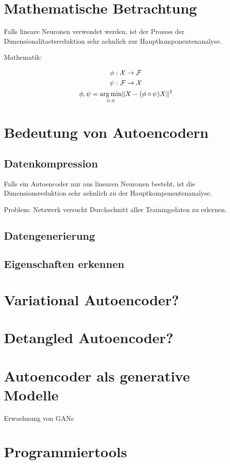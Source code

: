 \section{Mathematische Betrachtung}
Falls lineare Neuronen verwendet werden, ist der Prozess der
Dimensionalitaetsreduktion sehr aehnlich zur Hauptkomponentenanalyse.

Mathematik:


\begin{gather}
  \phi: \mathcal{X} \to \mathcal{F}\\
  \psi: \mathcal{F} \to \mathcal{X}\\
  \displaystyle\phi,\psi = \operatorname*{\arg \min}_{\phi,\psi} \lVert X - (\phi \circ \psi)X\rVert^2
\end{gather}

\section{Bedeutung von Autoencodern}
\subsection{Datenkompression}
Falls ein Autoencoder nur aus linearen Neuronen besteht, ist die
Dimensionsreduktion sehr aehnlich zu der Hauptkomponentenanalyse.

Problem: Netzwerk versucht Durchschnitt aller Trainingsdaten zu erlernen.
\subsection{Datengenerierung}
\subsection{Eigenschaften erkennen}


\section{Variational Autoencoder?}
\section{Detangled Autoencoder?}

\section{Autoencoder als generative Modelle}
Erwaehnung von GANs

\section{Programmiertools}

